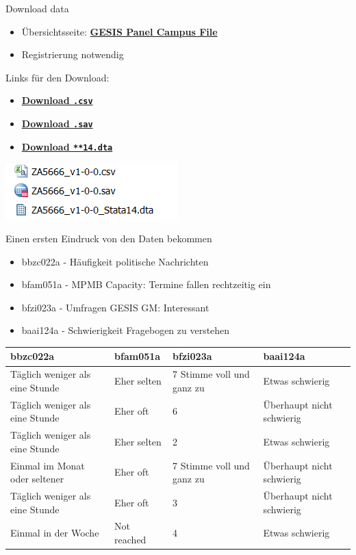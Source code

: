 \documentclass[ignorenonframetext,]{beamer}
\providecommand{\tightlist}{%
  \setlength{\itemsep}{0pt}\setlength{\parskip}{0pt}}
\begin{document}
\begin{frame}[fragile]{Download data}

\begin{itemize}
\tightlist
\item
  Übersichtsseite:
  \href{https://www.gesis.org/gesis-panel/data/gesis-panel-campus-file/}{\textbf{GESIS
  Panel Campus File}}
\item
  Registrierung notwendig
\end{itemize}

\begin{block}{Links für den Download:}

\begin{itemize}
\tightlist
\item
  \href{https://dbk.gesis.org/dbksearch/download.asp?db=D\&id=62367}{\textbf{Download
  \texttt{.csv}}}
\item
  \href{https://dbk.gesis.org/dbksearch/download.asp?db=D\&id=62369}{\textbf{Download
  \texttt{.sav}}}
\item
  \href{https://dbk.gesis.org/dbksearch/download.asp?db=D\&id=62371}{\textbf{Download
  \texttt{**14.dta}}}
\end{itemize}

\includegraphics{figure/filenamesGP2.PNG}

\end{block}

\end{frame}

\begin{frame}{Einen ersten Eindruck von den Daten bekommen}

\begin{itemize}
\tightlist
\item
  bbzc022a - Häufigkeit politische Nachrichten
\item
  bfam051a - MPMB Capacity: Termine fallen rechtzeitig ein
\item
  bfzi023a - Umfragen GESIS GM: Interessant
\item
  baai124a - Schwierigkeit Fragebogen zu verstehen
\end{itemize}

\begin{longtable}[]{@{}llll@{}}
\toprule
bbzc022a & bfam051a & bfzi023a & baai124a\tabularnewline
\midrule
\endhead
Täglich weniger als eine Stunde & Eher selten & 7 Stimme voll und ganz
zu & Etwas schwierig\tabularnewline
Täglich weniger als eine Stunde & Eher oft & 6 & Überhaupt nicht
schwierig\tabularnewline
Täglich weniger als eine Stunde & Eher selten & 2 & Etwas
schwierig\tabularnewline
Einmal im Monat oder seltener & Eher oft & 7 Stimme voll und ganz zu &
Überhaupt nicht schwierig\tabularnewline
Täglich weniger als eine Stunde & Eher oft & 3 & Überhaupt nicht
schwierig\tabularnewline
Einmal in der Woche & Not reached & 4 & Etwas schwierig\tabularnewline
\bottomrule
\end{longtable}

\end{frame}
\end{document}
